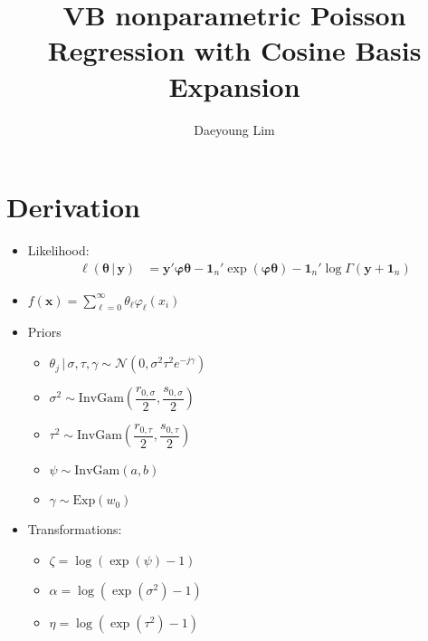 \documentclass[review]{elsarticle}
\begin{document}
\begin{frontmatter}

\title{VB nonparametric Poisson Regression with Cosine Basis Expansion}
\author{Daeyoung Lim}


\end{frontmatter}

\linenumbers
\section{Derivation}
\begin{itemize}
  \item Likelihood:
  \begin{align}
    \ell\left(\bm{\theta}\,|\,\mathbf{y}\right) &= \mathbf{y}'\bm{\varphi\theta}-\mathbf{1}_{n}'\exp\left(\bm{\varphi\theta}\right)-\mathbf{1}_{n}'\log\Gamma\left(\mathbf{y}+\mathbf{1}_{n}\right)
  \end{align}
  \item $f(\mathbf{x})=\displaystyle \sum_{\ell=0}^{\infty} \theta_{\ell}\varphi_{\ell}\left(x_{i}\right)$
  \item Priors
  \begin{itemize}
    \item $\theta_{j}\,|\,\sigma,\tau,\gamma \sim \mathcal{N}\left(0,\sigma^{2}\tau^{2}e^{-j\gamma}\right)$
    \item $\sigma^{2} \sim \mathrm{InvGam}\left(\dfrac{r_{0,\sigma}}{2},\dfrac{s_{0,\sigma}}{2}\right)$
    \item $\tau^{2} \sim \mathrm{InvGam}\left(\dfrac{r_{0,\tau}}{2},\dfrac{s_{0,\tau}}{2}\right)$
    \item $\psi \sim \mathrm{InvGam}(a,b)$
    \item $\gamma\sim\mathrm{Exp}\left(w_{0}\right)$
  \end{itemize}
  \item Transformations:
  \begin{itemize}
    \item $\zeta = \log(\exp(\psi)-1)$
    \item $\alpha=\log(\exp(\sigma^{2})-1)$
    \item $\eta = \log(\exp(\tau^{2})-1)$

\end{itemize}
\end{itemize}
\end{document}
